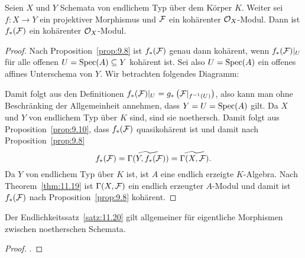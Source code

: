 \begin{satz}[Endlichkeitssatz]
\label{satz:11.20}
	Seien $X$ und $Y$ Schemata von endlichem Typ über dem Körper $K$. Weiter sei $f \colon X \to Y$ ein projektiver Morphismus und $\mathcal{F}$ ein kohärenter $\mathcal{O}_X$-Modul. Dann ist $f_*(\mathcal{F})$ ein kohärenter $\mathcal{O}_X$-Modul.
	\begin{proof}
		Nach Proposition~\ref{prop:9.8} ist $f_*(\mathcal{F})$ genau dann kohärent, wenn $f_*(\mathcal{F})\vert_U$ für alle offenen $U = \operatorname{Spec}(A) \subseteq Y$ kohärent ist. Sei also $U = \operatorname{Spec}(A)$ ein offenes affines Unterschema von $Y$. Wir betrachten folgendes Diagramm:
		\begin{center}
		\end{center}
		Damit folgt aus den Definitionen $f_*(\mathcal{F})\vert_U = g_*\left(\mathcal{F}\vert_{f^{-1}(U)}\right)$, also kann man ohne Beschränking der Allgemeinheit annehmen, dass $Y=U=\operatorname{Spec}(A)$ gilt. Da $X$ und $Y$ von endlichem Typ über $K$ sind, sind sie noethersch. Damit folgt aus Proposition~\ref{prop:9.10}, dass $f_*(\mathcal{F})$ quasikohärent ist und damit nach Proposition~\ref{prop:9.8}
		\[
			f_*(\mathcal{F}) = \widetilde{\Gamma(Y,f_*(\mathcal{F}))} = \widetilde{\Gamma(X,\mathcal{F})}.
		\]
		Da $Y$ von endlichem Typ über $K$ ist, ist $A$ eine endlich erzeigte $K$-Algebra. Nach Theorem~\ref{thm:11.19} ist $\Gamma(X,\mathcal{F})$ ein endlich erzeugter $A$-Modul und damit ist $f_*(\mathcal{F})$ nach Proposition~\ref{prop:9.8} kohärent.
	\end{proof}
\end{satz}

\begin{bem}
\label{bem:11.21}
	Der Endlichkeitssatz~\ref{satz:11.20} gilt allgemeiner für eigentliche Morphismen zwischen noetherschen Schemata.
	\begin{proof}
		\cite[Théorème~3.2.1]{grothendieck1961elementsiii}.
	\end{proof}
\end{bem}

